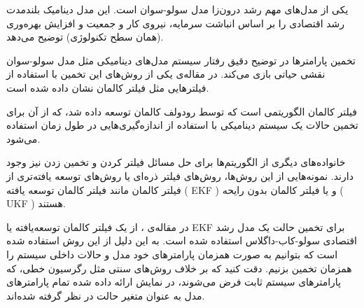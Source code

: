 \documentclass[11pt, fleqn]{article}
\begin{document}
 
\newhline




























\begin{multicols}{2}



	یکی از مدل‌های مهم رشد درون‌زا مدل سولو-سوان
 است. این مدل دینامیک بلندمدت رشد اقتصادی را بر اساس انباشت سرمایه، نیروی کار و جمعیت و افزایش بهره‌وری (همان سطح تکنولوژی) توضیح می‌دهد. 
 
 
 
 
 تخمین پارامتر‌ها در توضیح دقیق رفتار سیستم مدل‌های دینامیکی مثل مدل سولو-سوان نقشی حیاتی بازی می‌کند. در مقاله‌ی
 \cite{main}
یکی از روش‌های این تخمین با استفاده از فیلتر‌هایی مثل فیلتر کالمان
نشان داده شده است.  


فیلتر کالمان الگوریتمی است که توسط رودولف کالمان 
توسعه داده شد، که از آن‌ برای تخمین حالات یک سیستم‌ دینامیکی با استفاده از اندازه‌‌گیری‌هایی در طول زمان استفاده می‌شود.

 خانواده‌‌های دیگری از الگوریتم‌ها برای حل مسائل فیلتر کردن و تخمین زدن نیز وجود دارند. نمونه‌هایی از این روش‌ها، روش‌های فیلتر‌ ذره‌ای 
 یا روش‌های توسعه‌ یافته‌تری از فیلتر کالمان مانند فیلتر کالمان توسعه یافته 
 (
 EKF
 ) و یا فیلتر کالمان بدون رایحه
(
UKF
)
هستند.
 
 
 
در مقاله‌ی
\cite{main}
، از یک فیلتر کالمان توسعه‌یافته یا
 EKF
  برای تخمین حالت یک مدل رشد اقتصادی سولو-کاب-داگلاس استفاده شده است. به این دلیل از این روش استفاده شده است که بتوانیم به صورت همزمان پارامتر‌های خود مدل و حالات داخلی سیستم را همزمان تخمین بزنیم.
دقت کنید که بر خلاف روش‌های سنتی مثل رگرسیون خطی، که پارامتر‌های سیستم ثابت فرض می‌شوند، در نمایش ارائه داده شده تمام پارامتر‌های مدل به عنوان متغیر حالت در نظر گرفته شده‌اند. 


\end{multicols}
\end{document}

